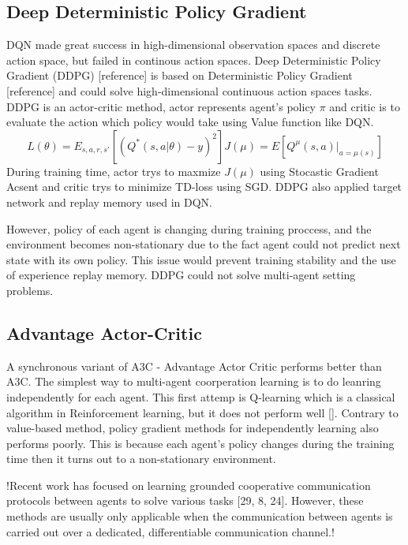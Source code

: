 \documentclass[11pt,twocolumn]{jarticle} %
\begin{document}
\subsection{Deep Deterministic Policy Gradient}
DQN made great success in high-dimensional observation spaces and discrete action space, but failed in continous action spaces. Deep Deterministic Policy Gradient (DDPG) [reference] is based on Deterministic Policy Gradient [reference] and could solve high-dimensional continuous action spaces tasks. DDPG is an actor-critic method, actor represents agent's policy $\pi$ and critic is to evaluate the action which policy would take using Value function like DQN. 
\begin{equation}
L(\theta) = E_{s,a,r,s'}[(Q^*(s, a|\theta) - y)^2] 
J(\mu) = E[Q^\mu(s, a) | _{a=\mu(s)}]
\end{equation}
During training time, actor trys to maxmize $J(\mu)$ using Stocastic Gradient Acsent and critic trys to minimize TD-loss using SGD. DDPG also applied target network and replay memory used in DQN. \par
However, policy of each agent is changing during training proccess, and the environment becomes non-stationary due to the fact agent could not predict next state with its own policy. This issue would prevent training stability and the use of experience replay memory. DDPG could not solve multi-agent setting problems.

\subsection{Advantage Actor-Critic}
A synchronous variant of A3C - Advantage Actor Critic performs better than A3C.
The simplest way to multi-agent coorperation learning is to do leanring independently for each agent. This first attemp is Q-learning which is a classical algorithm in Reinforcement learning, but it does not perform well []. Contrary to value-based method, policy gradient methods for independently learning also performs poorly. This is because each agent's policy changes during the training time then it turns out to a non-stationary environment. \par

!Recent work has focused on learning grounded cooperative communication protocols between agents to solve various tasks [29, 8, 24]. However, these methods are usually only applicable when the communication between agents is carried out over a dedicated, differentiable communication channel.! \par
\end{document}
